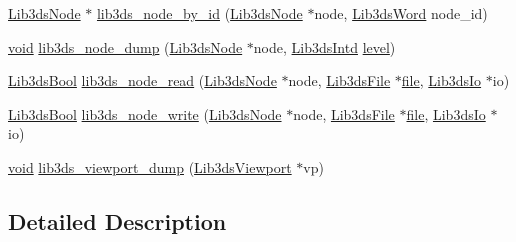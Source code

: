 \begin{DoxyCompactItemize}
\hyperlink{struct_lib3ds_node}{Lib3ds\-Node} $\ast$ \hyperlink{group__node_gab44701e36a915bc02085cee754729112}{lib3ds\-\_\-node\-\_\-by\-\_\-id} (\hyperlink{struct_lib3ds_node}{Lib3ds\-Node} $\ast$node, \hyperlink{types_8h_a439f68d12f4ad080599044949e41dba1}{Lib3ds\-Word} node\-\_\-id)
\item 
\hyperlink{group___u_a_v_objects_plugin_ga444cf2ff3f0ecbe028adce838d373f5c}{void} \hyperlink{group__node_ga93a8b6768a12ca108826fcf1c15ce77c}{lib3ds\-\_\-node\-\_\-dump} (\hyperlink{struct_lib3ds_node}{Lib3ds\-Node} $\ast$node, \hyperlink{types_8h_a5d92ad41149cf040ce2ee32cc2609403}{Lib3ds\-Intd} \hyperlink{glext_8h_abc60a79088789bd61297bf5f9ff500d1}{level})
\item 
\hyperlink{types_8h_a89dd7398a9ebbbf28011f8c32df67ad3}{Lib3ds\-Bool} \hyperlink{group__node_ga1b2fcdd254251e3ae3be52b2efd4975f}{lib3ds\-\_\-node\-\_\-read} (\hyperlink{struct_lib3ds_node}{Lib3ds\-Node} $\ast$node, \hyperlink{struct_lib3ds_file}{Lib3ds\-File} $\ast$\hyperlink{uavobjecttemplate_8m_a97c04efa65bcf0928abf9260bc5cbf46}{file}, \hyperlink{struct_lib3ds_io}{Lib3ds\-Io} $\ast$io)
\item 
\hyperlink{types_8h_a89dd7398a9ebbbf28011f8c32df67ad3}{Lib3ds\-Bool} \hyperlink{group__node_gab78e5ee08c53cc258a2627c16d2d3c0f}{lib3ds\-\_\-node\-\_\-write} (\hyperlink{struct_lib3ds_node}{Lib3ds\-Node} $\ast$node, \hyperlink{struct_lib3ds_file}{Lib3ds\-File} $\ast$\hyperlink{uavobjecttemplate_8m_a97c04efa65bcf0928abf9260bc5cbf46}{file}, \hyperlink{struct_lib3ds_io}{Lib3ds\-Io} $\ast$io)
\item 
\hyperlink{group___u_a_v_objects_plugin_ga444cf2ff3f0ecbe028adce838d373f5c}{void} \hyperlink{group__node_gab99f91427259158cd364a1b0343f9509}{lib3ds\-\_\-viewport\-\_\-dump} (\hyperlink{struct_lib3ds_viewport}{Lib3ds\-Viewport} $\ast$vp)
\end{DoxyCompactItemize}


\subsection{Detailed Description}


